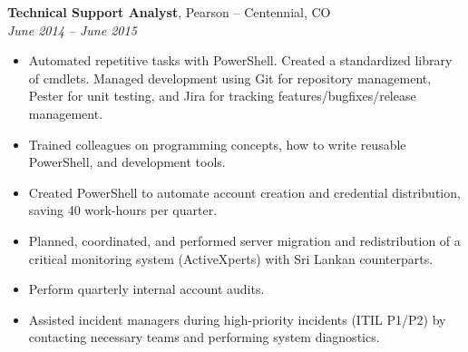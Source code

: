 {\bf Technical Support Analyst}, Pearson -- Centennial, CO\\
{\it June 2014 – June 2015}
\begin{itemize}
	\item Automated repetitive tasks with PowerShell. Created a standardized library of cmdlets. Managed development using Git for repository management, Pester for unit testing, and Jira for tracking features/bugfixes/release management.
	\item Trained colleagues on programming concepts, how to write reusable PowerShell, and development tools.
	\item Created PowerShell to automate account creation and credential distribution, saving 40 work-hours per quarter.
	\item Planned, coordinated, and performed server migration and redistribution of a critical monitoring system (ActiveXperts) with Sri Lankan counterparts.
	\item Perform quarterly internal account audits.
	\item Assisted incident managers during high-priority incidents (ITIL P1/P2) by contacting necessary teams and performing system diagnostics.
\end{itemize}